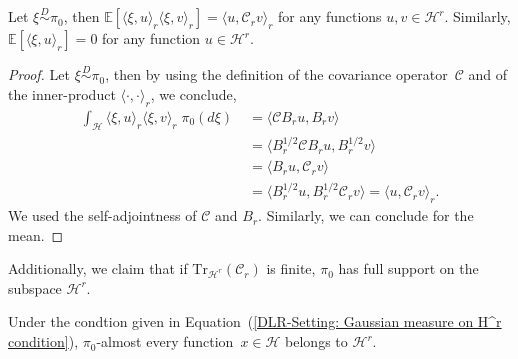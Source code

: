 \begin{proposition}
\label{DLR-Setting: Proposition Gaussian measure}
 Let $\xi \stackrel{D}{\sim} \pi_0$, then $\mathbb{E} [\langle \xi, u \rangle_r \langle \xi , v \rangle_r ] = \langle u , \mathcal{C}_r v \rangle_r$ for any functions $u,v \in \mathcal{H}^r$. Similarly, $\mathbb{E} [\langle \xi, u \rangle_r  ] = 0$ for any function $u \in \mathcal{H}^r$.
\end{proposition}

\begin{proof}
 Let $\xi \stackrel{D}{\sim} \pi_0$, then by using the definition of the covariance operator~$\mathcal{C}$ and of the inner-product $\langle \cdot, \cdot \rangle_r$, we conclude,
 \begin{align*}
  \int_{\mathcal{H}} \langle \xi, u \rangle_r \langle \xi , v \rangle_r \; \pi_0 (d\xi) & \; = \langle \mathcal{C} B_r u , B_r v \rangle \\
  & \; = \langle B_r^{1/2} \mathcal{C} B_r u , B_r^{1/2} v \rangle \\
  & \; = \langle  B_r u , \mathcal{C}_r v \rangle \\	
  & \; = \langle  B_r^{1/2} u , B_r^{1/2} \mathcal{C}_r v \rangle = \langle u, \mathcal{C}_r v \rangle_r.
 \end{align*}
 We used the self-adjointness of $\mathcal{C}$ and $B_r$. Similarly, we can conclude for the mean.

\end{proof}

Additionally, we claim that if $\text{Tr}_{\mathcal{H}^r}(\mathcal{C}_r)$ is finite, $\pi_0$ has full support on the subspace $\mathcal{H}^r$.

\begin{proposition}
\label{DLR-Setting: Proposition Full support}
 Under the condtion given in Equation~(\ref{DLR-Setting: Gaussian measure on H^r condition}), $\pi_0 $-almost every function~$x \in \mathcal{H}$ belongs to $\mathcal{H}^r$.
\end{proposition}

